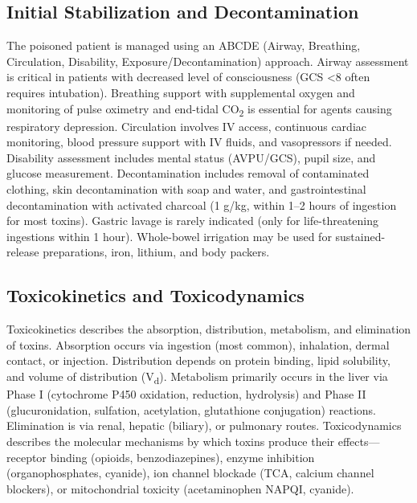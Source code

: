\subsection{Initial Stabilization and Decontamination}
\label{sec:Initial Stabilization}
The poisoned patient is managed using an ABCDE (Airway, Breathing, Circulation, Disability, Exposure/Decontamination) approach. Airway assessment is critical in patients with decreased level of consciousness (GCS <8 often requires intubation). Breathing support with supplemental oxygen and monitoring of pulse oximetry and end-tidal CO\textsubscript{2} is essential for agents causing respiratory depression. Circulation involves IV access, continuous cardiac monitoring, blood pressure support with IV fluids, and vasopressors if needed. Disability assessment includes mental status (AVPU/GCS), pupil size, and glucose measurement. Decontamination includes removal of contaminated clothing, skin decontamination with soap and water, and gastrointestinal decontamination with activated charcoal (1 g/kg, within 1--2 hours of ingestion for most toxins). Gastric lavage is rarely indicated (only for life-threatening ingestions within 1 hour). Whole-bowel irrigation may be used for sustained-release preparations, iron, lithium, and body packers.

\subsection{Toxicokinetics and Toxicodynamics}
\label{sec:Toxicokinetics and Toxicodynamics}
Toxicokinetics describes the absorption, distribution, metabolism, and elimination of toxins. Absorption occurs via ingestion (most common), inhalation, dermal contact, or injection. Distribution depends on protein binding, lipid solubility, and volume of distribution (V\textsubscript{d}). Metabolism primarily occurs in the liver via Phase I (cytochrome P450 oxidation, reduction, hydrolysis) and Phase II (glucuronidation, sulfation, acetylation, glutathione conjugation) reactions. Elimination is via renal, hepatic (biliary), or pulmonary routes. Toxicodynamics describes the molecular mechanisms by which toxins produce their effects---receptor binding (opioids, benzodiazepines), enzyme inhibition (organophosphates, cyanide), ion channel blockade (TCA, calcium channel blockers), or mitochondrial toxicity (acetaminophen NAPQI, cyanide).

